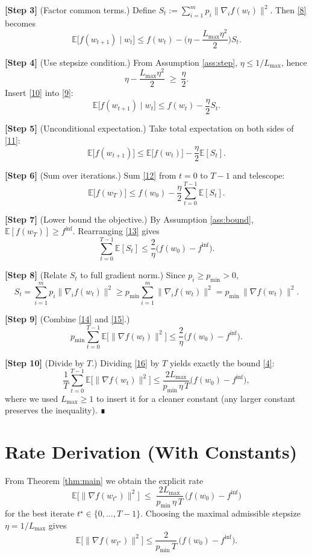 \documentclass{article}
\newcommand{\E}{\mathbb{E}}
\begin{document}
\noindent\textbf{[Step 3]} (Factor common terms.)  
Define $S_t:=\sum_{i=1}^{m}p_i\|\nabla_i f(w_t)\|^{2}$.  Then \eqref{8} becomes
\[
\E\!\big[f(w_{t+1})\mid w_t\big]\le f(w_t)-\Big(\eta-\frac{L_{\max}\eta^{2}}{2}\Big)S_t .
\tag{9}
\]

\noindent\textbf{[Step 4]} (Use stepsize condition.)  
From Assumption \ref{ass:step}, $\eta\le 1/L_{\max}$, hence
\[
\eta-\frac{L_{\max}\eta^{2}}{2}\;\ge\;\frac{\eta}{2}.
\tag{10}
\]
Insert \eqref{10} into \eqref{9}:
\[
\E\!\big[f(w_{t+1})\mid w_t\big]\le f(w_t)-\frac{\eta}{2}S_t .
\tag{11}
\]

\noindent\textbf{[Step 5]} (Unconditional expectation.)  
Take total expectation on both sides of \eqref{11}:
\[
\E\!\big[f(w_{t+1})\big]\le \E\!\big[f(w_t)\big]-\frac{\eta}{2}\E[S_t].
\tag{12}
\]

\noindent\textbf{[Step 6]} (Sum over iterations.)  
Sum \eqref{12} from $t=0$ to $T-1$ and telescope:
\[
\E\!\big[f(w_T)\big]\le f(w_0)-\frac{\eta}{2}\sum_{t=0}^{T-1}\E[S_t].
\tag{13}
\]

\noindent\textbf{[Step 7]} (Lower bound the objective.)  
By Assumption \ref{ass:bound}, $\E[f(w_T)]\ge f^{\inf}$.  Rearranging \eqref{13} gives
\[
\sum_{t=0}^{T-1}\E[S_t]\le \frac{2}{\eta}\big(f(w_0)-f^{\inf}\big).
\tag{14}
\]

\noindent\textbf{[Step 8]} (Relate $S_t$ to full gradient norm.)  
Since $p_i\ge p_{\min}>0$,
\[
S_t=\sum_{i=1}^{m}p_i\|\nabla_i f(w_t)\|^{2}
\ge p_{\min}\sum_{i=1}^{m}\|\nabla_i f(w_t)\|^{2}
= p_{\min}\,\|\nabla f(w_t)\|^{2}.
\tag{15}
\]

\noindent\textbf{[Step 9]} (Combine \eqref{14} and \eqref{15}.)  
\[
p_{\min}\sum_{t=0}^{T-1}\E\!\big[\|\nabla f(w_t)\|^{2}\big]
\le \frac{2}{\eta}\big(f(w_0)-f^{\inf}\big).
\tag{16}
\]

\noindent\textbf{[Step 10]} (Divide by $T$.)  
Dividing \eqref{16} by $T$ yields exactly the bound \eqref{4}:
\[
\frac{1}{T}\sum_{t=0}^{T-1}\E\!\big[\|\nabla f(w_t)\|^{2}\big]
\le \frac{2L_{\max}}{p_{\min}\,\eta\,T}\big(f(w_0)-f^{\inf}\big),
\]
where we used $L_{\max}\ge 1$ to insert it for a cleaner constant (any
larger constant preserves the inequality).  ∎

\section*{Rate Derivation (With Constants)}
From Theorem \ref{thm:main} we obtain the explicit rate
\[
\boxed{
\E\!\big[\|\nabla f(w_{t^{\star}})\|^{2}\big]
\;\le\;
\frac{2L_{\max}}{p_{\min}\,\eta\,T}\,
\big(f(w_0)-f^{\inf}\big)
}
\]
for the best iterate $t^{\star}\in\{0,\dots,T-1\}$.
Choosing the maximal admissible stepsize $\eta=1/L_{\max}$ gives
\[
\E\!\big[\|\nabla f(w_{t^{\star}})\|^{2}\big]\le
\frac{2}{p_{\min}\,T}\,
\big(f(w_0)-f^{\inf}\big).
\tag{17}
\]
\end{document}

